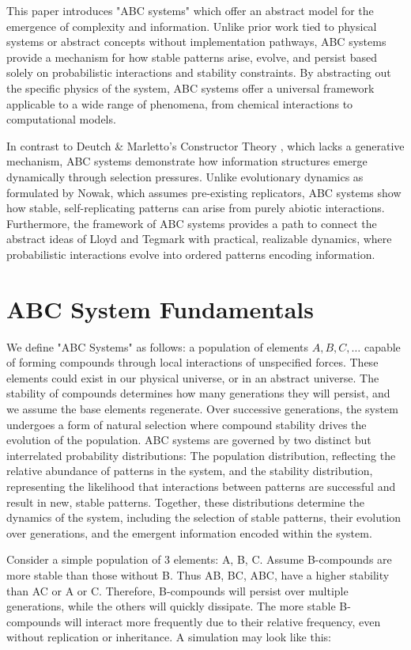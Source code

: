 \documentclass[entropy,article,submit,pdftex,moreauthors]{Definitions/mdpi}
\begin{document}
This paper introduces "ABC systems" which offer an abstract model for the emergence of complexity and information. Unlike prior work tied to physical systems or abstract concepts without implementation pathways, ABC systems provide a mechanism for how stable patterns arise, evolve, and persist based solely on probabilistic interactions and stability constraints. By abstracting out the specific physics of the system, ABC systems offer a universal framework applicable to a wide range of phenomena, from chemical interactions to computational models.

In contrast to Deutch \& Marletto's Constructor Theory \cite{deutsch2013constructor}, which lacks a generative mechanism, ABC systems demonstrate how information structures emerge dynamically through selection pressures. Unlike evolutionary dynamics as formulated by Nowak, which assumes pre-existing replicators, ABC systems show how stable, self-replicating patterns can arise from purely abiotic interactions. Furthermore, the framework of ABC systems provides a path to connect the abstract ideas of Lloyd and Tegmark with practical, realizable dynamics, where probabilistic interactions evolve into ordered patterns encoding information.

\section{ABC System Fundamentals}

We define "ABC Systems" as follows: a population of elements \( A, B, C, \dots \) capable of forming compounds through local interactions of unspecified forces. These elements could exist in our physical universe, or in an abstract universe. The stability of compounds determines how many generations they will persist, and we assume the base elements regenerate. Over successive generations, the system undergoes a form of natural selection where compound stability drives the evolution of the population. ABC systems are governed by two distinct but interrelated probability distributions: The population distribution, reflecting the relative abundance of patterns in the system, and the stability distribution, representing the likelihood that interactions between patterns are successful and result in new, stable patterns. Together, these distributions determine the dynamics of the system, including the selection of stable patterns, their evolution over generations, and the emergent information encoded within the system.

Consider a simple population of 3 elements: {A, B, C}. Assume B-compounds are more stable than those without B. Thus AB, BC, ABC, have a higher stability than AC or A or C. Therefore, B-compounds will persist over multiple generations, while the others will quickly dissipate. The more stable B-compounds will interact more frequently due to their relative frequency, even without replication or inheritance. A simulation may look like this:
\end{document}
